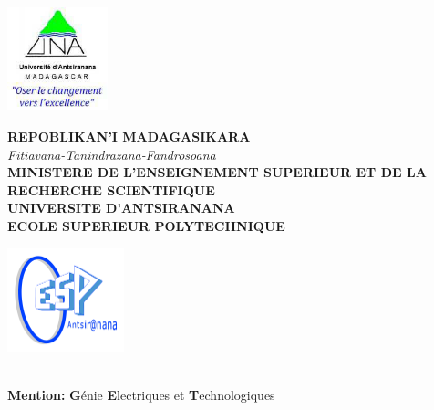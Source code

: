 \documentclass[a4paper,12pt]{report}
\begin{document}
\begin{titlepage}

\begin{center}
	\begin{minipage}{2.5cm}
	\begin{center}
		\includegraphics[height=3cm]{Univ.png}
		
	\end{center}
\end{minipage}\hfill
\begin{minipage}{10cm}
	\begin{center}
	\textbf{REPOBLIKAN'I MADAGASIKARA }\\[0.1cm]
	\textit{Fitiavana-Tanindrazana-Fandrosoana }\\[0.1cm] 	\vspace{5mm}
    \textbf{MINISTERE DE L'ENSEIGNEMENT SUPERIEUR ET DE LA RECHERCHE SCIENTIFIQUE}\\[0.1cm]
    \vspace{3.5mm}
    \textbf{UNIVERSITE D'ANTSIRANANA}\\[0.1cm]
    \vspace{5mm}
    \textbf{ECOLE SUPERIEUR POLYTECHNIQUE}


	\end{center}
\end{minipage}\hfill
\begin{minipage}{2.5cm}
	\begin{center}
		\includegraphics[height=3cm]{ESP.png}
	\end{center}

\end{minipage}


\textsc{\Large}\\[1.5cm]
{\large \bfseries Mention: }
{\large  \textbf{G}énie \textbf{E}lectriques et \textbf{T}echnologiques }\\[0.5cm]


\end{center}
\end{titlepage}
\end{document}
